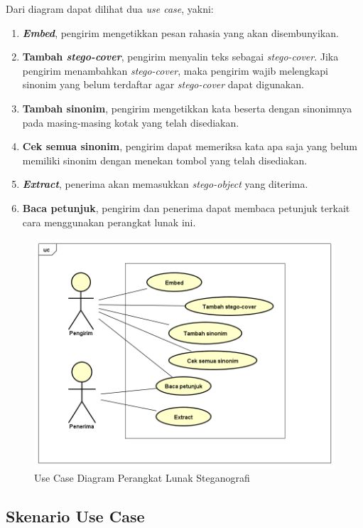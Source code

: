Dari diagram dapat dilihat dua \textit{use case}, yakni:
\begin{enumerate}
	\item \textbf{\textit{Embed}}, pengirim mengetikkan pesan rahasia yang akan disembunyikan.
	\item \textbf{Tambah \textit{stego-cover}}, pengirim menyalin teks sebagai \textit{stego-cover}. Jika pengirim menambahkan \textit{stego-cover}, maka pengirim wajib melengkapi sinonim yang belum terdaftar agar \textit{stego-cover} dapat digunakan.
	\item \textbf{Tambah sinonim}, pengirim mengetikkan kata beserta dengan sinonimnya pada masing-masing kotak yang telah disediakan.
	\item \textbf{Cek semua sinonim}, pengirim dapat memeriksa kata apa saja yang belum memiliki sinonim dengan menekan tombol yang telah disediakan.
	\item \textbf{\textit{Extract}}, penerima akan memasukkan \textit{stego-object} yang diterima.
	\item \textbf{Baca petunjuk}, pengirim dan penerima dapat membaca petunjuk terkait cara menggunakan perangkat lunak ini.
\end{enumerate}

\begin{figure}[H]
	\centering
	\includegraphics[scale=0.5]{Gambar/usecase}
	\caption{Use Case Diagram Perangkat Lunak Steganografi} 
	\label{fig:3_usecase}
\end{figure}

\subsection{Skenario Use Case}

